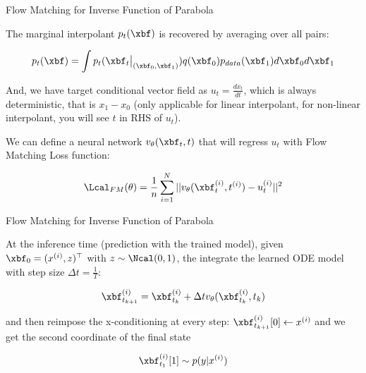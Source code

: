 \documentclass[aspectratio=169,xcolor=dvipsnames,svgnames,x11names,fleqn]{beamer}
\begin{document}
\begin{frame}{Flow  Matching for Inverse Function of Parabola}

The marginal interpolant $p_t(\xbf)$ is recovered by averaging over all pairs:

  \begin{tcolorbox}[    enhanced,
    colback=softMint,
    colframe=borderLine,
    sharp corners,
    arc=0pt, 
    boxrule=0.4pt,
    leftrule=3pt,
    borderline west={5pt}{0pt}{highlightOrange}, 
    fontupper=\color{boxBackground},
    pad at break*=0mm,
    top=1pt, bottom=2pt, left=5pt, right=5pt]
\begin{align*}
p_t(\xbf) = \int p_t(\xbf_t \big|_{(\xbf_0, \xbf_1)}) q(\xbf_0)p_{data}(\xbf_1) d\xbf_0 d\xbf_1
\end{align*}
\end{tcolorbox}

And, we have target conditional vector field as $u_t = \frac{dx_t}{dt}$, which is always deterministic, that is $x_1 - x_0$ (only applicable for linear interpolant, for non-linear interpolant, you will see $t$ in RHS of $u_t$).

\vspace{5pt}

\fleuronRule

\vspace{5pt}

We can define a neural network $v_\theta(\xbf_t, t)$ that will regress $u_t$ with Flow Matching Loss function:

\begin{align*}
\Lcal_{FM}(\theta) = \frac{1}{n}\sum_{i=1}^N ||  v_\theta( \xbf_t^{(i)}, t^{(i)}) - u_t^{(i)}||^2
\end{align*}


\end{frame}

\begin{frame}{Flow  Matching for Inverse Function of Parabola}

At the inference time (prediction with the trained model), given $\xbf_0 = (x^{(i)},z )^\top$ with $z \sim \Ncal(0, 1)$, the integrate the learned ODE model with step size $\Delta t = \frac{1}{T}$:

\begin{align*}
\xbf_{t_{k+1}}^{(i)} = \xbf_{t_{k}}^{(i)}  + \Delta t v_\theta (  \xbf_{t_{k}}^{(i)}, t_k)
\end{align*}

and then reimpose the x-conditioning at every step: $\xbf_{t_{k+1}}^{(i)}[0] \leftarrow x^{(i)}$ and we get the second coordinate of the final state 

\begin{align*}
\xbf_{t_1}^{(i)}[1] \sim p(y|x^{(i)})
\end{align*}

\end{frame}
\end{document}
